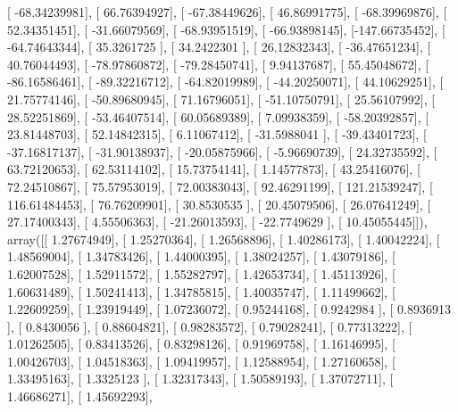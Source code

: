 \documentclass{article}
\begin{document}
       [ -68.34239981],
       [  66.76394927],
       [ -67.38449626],
       [  46.86991775],
       [ -68.39969876],
       [  52.34351451],
       [ -31.66079569],
       [ -68.93951519],
       [ -66.93898145],
       [-147.66735452],
       [ -64.74643344],
       [  35.3261725 ],
       [  34.2422301 ],
       [  26.12832343],
       [ -36.47651234],
       [  40.76044493],
       [ -78.97860872],
       [ -79.28450741],
       [   9.94137687],
       [  55.45048672],
       [ -86.16586461],
       [ -89.32216712],
       [ -64.82019989],
       [ -44.20250071],
       [  44.10629251],
       [  21.75774146],
       [ -50.89680945],
       [  71.16796051],
       [ -51.10750791],
       [  25.56107992],
       [  28.52251869],
       [ -53.46407514],
       [  60.05689389],
       [   7.09938359],
       [ -58.20392857],
       [  23.81448703],
       [  52.14842315],
       [   6.11067412],
       [ -31.5988041 ],
       [ -39.43401723],
       [ -37.16817137],
       [ -31.90138937],
       [ -20.05875966],
       [  -5.96690739],
       [  24.32735592],
       [  63.72120653],
       [  62.53114102],
       [  15.73754141],
       [   1.14577873],
       [  43.25416076],
       [  72.24510867],
       [  75.57953019],
       [  72.00383043],
       [  92.46291199],
       [ 121.21539247],
       [ 116.61484453],
       [  76.76209901],
       [  30.8530535 ],
       [  20.45079506],
       [  26.07641249],
       [  27.17400343],
       [   4.55506363],
       [ -21.26013593],
       [ -22.7749629 ],
       [  10.45055445]]), array([[ 1.27674949],
       [ 1.25270364],
       [ 1.26568896],
       [ 1.40286173],
       [ 1.40042224],
       [ 1.48569004],
       [ 1.34783426],
       [ 1.44000395],
       [ 1.38024257],
       [ 1.43079186],
       [ 1.62007528],
       [ 1.52911572],
       [ 1.55282797],
       [ 1.42653734],
       [ 1.45113926],
       [ 1.60631489],
       [ 1.50241413],
       [ 1.34785815],
       [ 1.40035747],
       [ 1.11499662],
       [ 1.22609259],
       [ 1.23919449],
       [ 1.07236072],
       [ 0.95244168],
       [ 0.9242984 ],
       [ 0.8936913 ],
       [ 0.8430056 ],
       [ 0.88604821],
       [ 0.98283572],
       [ 0.79028241],
       [ 0.77313222],
       [ 1.01262505],
       [ 0.83413526],
       [ 0.83298126],
       [ 0.91969758],
       [ 1.16146995],
       [ 1.00426703],
       [ 1.04518363],
       [ 1.09419957],
       [ 1.12588954],
       [ 1.27160658],
       [ 1.33495163],
       [ 1.3325123 ],
       [ 1.32317343],
       [ 1.50589193],
       [ 1.37072711],
       [ 1.46686271],
       [ 1.45692293],
\end{document}
